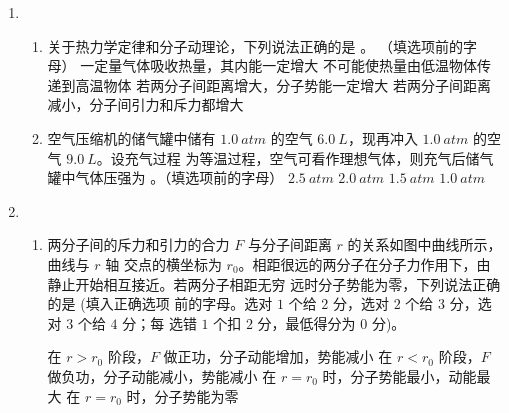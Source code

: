 \begin{enumerate}
\begin{enumerate}
\end{enumerate}


\item 
{}
\begin{enumerate}
	\item
关于热力学定律和分子动理论，下列说法正确的是 \underlinegap 。
（填选项前的字母）
\fourchoices
{一定量气体吸收热量，其内能一定增大}
{不可能使热量由低温物体传递到高温物体}
{若两分子间距离增大，分子势能一定增大}
{若两分子间距离减小，分子间引力和斥力都增大}



\item 
空气压缩机的储气罐中储有 $ 1.0 \ atm $ 的空气 $ 6.0 \ L $，现再冲入 $ 1.0 \ atm $ 的空气 $ 9.0 \ L $。设充气过程
为等温过程，空气可看作理想气体，则充气后储气罐中气体压强为 \underlinegap 。（填选项前的字母）
\fourchoices
{$ 2.5 \ atm $}
{$ 2.0 \ atm $}
{$ 1.5 \ atm $}
{$ 1.0 \ atm $}



\end{enumerate}



\item 
{}
\begin{enumerate}
	\item
两分子间的斥力和引力的合力 $ F $ 与分子间距离 $ r $ 的关系如图中曲线所示，曲线与 $ r $ 轴
交点的横坐标为 $ r_{0} $。相距很远的两分子在分子力作用下，由静止开始相互接近。若两分子相距无穷
远时分子势能为零，下列说法正确的是 \underlinegap (填入正确选项
前的字母。选对 $ 1 $ 个给 $ 2 $ 分，选对 $ 2 $ 个给 $ 3 $ 分，选对 $ 3 $ 个给 $ 4 $ 分；每
选错 $ 1 $ 个扣 $ 2 $ 分，最低得分为 $ 0 $ 分)。
\begin{figure}[h!]
	\centering
	
\end{figure}

\fourchoices
{在 $ r>r_0 $ 阶段，$ F $ 做正功，分子动能增加，势能减小}
{在 $ r<r_0 $ 阶段，$ F $ 做负功，分子动能减小，势能减小}
{在 $ r=r_0 $ 时，分子势能最小，动能最大}
{在 $ r=r_0 $ 时，分子势能为零}


\end{enumerate}
\end{enumerate}

